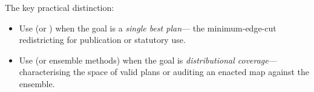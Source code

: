 The key practical distinction:
\begin{itemize}
\item Use \sa{} (or \be{}) when the goal is a \emph{single best plan}---
  the minimum-edge-cut redistricting for publication or statutory use.
\item Use \recom{} (or ensemble methods) when the goal is
  \emph{distributional coverage}---characterising the space of valid plans
  or auditing an enacted map against the ensemble.
\end{itemize}
